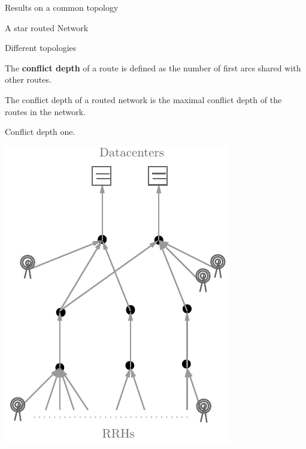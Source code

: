 \documentclass[10 pt]{beamer}
\begin{document}
\begin{section}{Results on a common topology}

\begin{subsection}{A star routed Network}
\begin{frame}{Different topologies}

The  {\bf conflict depth} of a route is defined as the number of first arcs shared with other routes.

The conflict depth of a routed network is the maximal conflict depth of the routes in the network.
  \centering
   \begin{multicols}{2}



 \vspace{1cm}
\centering
 Conflict depth one.
 

 

 
\includegraphics[scale=0.5]{extendendgraphgrey}\\
 \centering


\end{multicols}
\end{frame}
\end{subsection}
\end{section}
\end{document}
